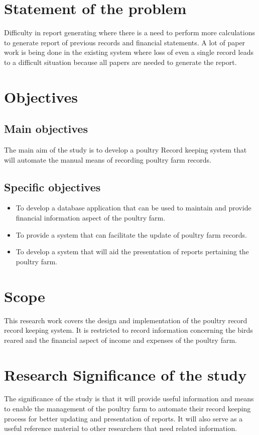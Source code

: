 \documentclass[12pt,]{article}
\begin{document}
\section{Statement of the problem}
Difficulty in report generating where there is a need to perform more calculations to generate report of previous records and financial statements. A lot of paper work is being done in the existing system where loss of even a single record leads to a difficult situation because all papers are needed to generate
the report.
\section{ Objectives}
\subsection{ Main objectives}
The main aim of the study is to develop a poultry Record keeping system
that will automate the manual means of recording poultry farm records.
\subsection{Specific objectives}
\begin{itemize}
\item To develop a database application that can be used to maintain and
provide financial information aspect of the poultry farm.
\item To provide a system that can facilitate the update of poultry farm
records.
\item To develop a system that will aid the presentation of reports pertaining
the poultry farm.
\end{itemize}

\section{Scope}
This research work covers the design and implementation of the poultry
record record keeping system. It is restricted to record information concerning the birds reared and the financial aspect of income and expenses of
the poultry farm.
\section{Research Significance of the study}
The significance of the study is that it will provide useful information and means to enable the management of the poultry farm to automate their record keeping process for better updating and presentation of reports. It will also serve as a useful reference material to other researchers that need
related information.
\end{document}
